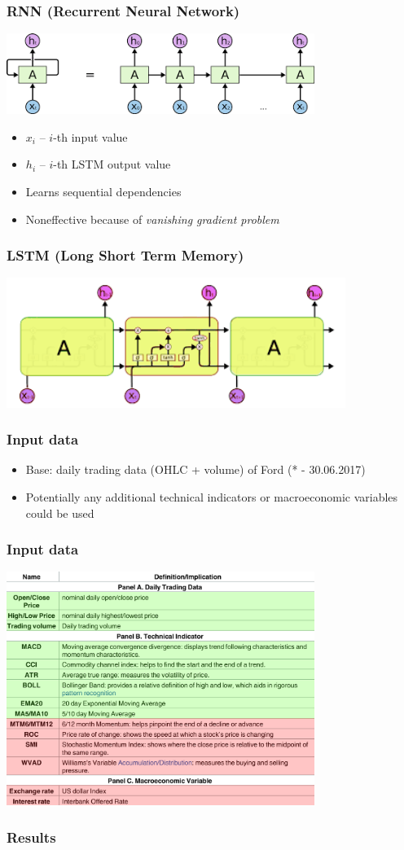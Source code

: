 \documentclass{beamer}
\begin{document}
\begin{frame}
\frametitle{RNN (Recurrent Neural Network)}
\includegraphics[width=10cm]{rnn.png}\vspace{20pt}
\begin{itemize}
\item $x_i$ -- $i$-th input value 
\item $h_i$ -- $i$-th LSTM output value
\item Learns sequential dependencies
\item Noneffective because of \emph{vanishing gradient problem}
\end{itemize}
\end{frame}

\begin{frame}
\frametitle{LSTM (Long Short Term Memory)}
\includegraphics[width=11cm]{lstm.png}
\end{frame}

\begin{frame}
\frametitle{Input data}
\begin{itemize}
\item Base: daily trading data (OHLC + volume) of Ford (* - 30.06.2017)
\item Potentially any additional technical indicators or macroeconomic variables could be used
\end{itemize}
\end{frame}

\begin{frame}
\frametitle{Input data}
\begin{center}
\includegraphics[width=10cm]{summary.png}
\end{center}
\end{frame}

\begin{frame}
\frametitle{Results}

\end{frame}
\end{document}
